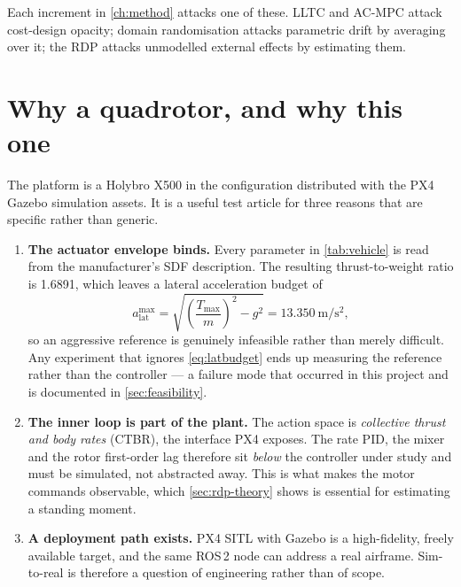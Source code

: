\documentclass[11pt,a4paper,twoside,openright]{report}
\newcommand{\vTW}{1.6891}                %
\DeclareRobustCommand{\ACMPC}{AC\nbd MPC}
\DeclareRobustCommand{\LLTC}{LLTC}
\DeclareRobustCommand{\RDP}{RDP}
\DeclareRobustCommand{\CTBR}{CTBR}
\theoremstyle{plain}
\theoremstyle{definition}
\theoremstyle{remark}
\DeclareRobustCommand{\nbd}{\mbox{-}}
\begin{document}
	Each increment in \cref{ch:method} attacks one of these. \LLTC{} and \ACMPC{}
	attack cost-design opacity; domain randomisation attacks parametric drift by
	averaging over it; the \RDP{} attacks unmodelled external effects by estimating
	them.

	\section{Why a quadrotor, and why this one}

	The platform is a Holybro X500 in the configuration distributed with the PX4
	Gazebo simulation assets. It is a useful test article for three reasons that are
	specific rather than generic.

	\begin{enumerate}[leftmargin=*]
		\item \textbf{The actuator envelope binds.} Every parameter in
		\cref{tab:vehicle} is read from the manufacturer's SDF description. The
		resulting thrust-to-weight ratio is \vTW, which leaves a lateral
		acceleration budget of
		\begin{equation}
			a_\mathrm{lat}^{\max}=\sqrt{\left(\frac{T_{\max}}{m}\right)^{\!2}-g^2}
			=\SI{13.350}{\metre\per\square\second},
			\label{eq:latbudget}
		\end{equation}
		so an aggressive reference is genuinely infeasible rather than merely
		difficult. Any experiment that ignores \cref{eq:latbudget} ends up measuring
		the reference rather than the controller --- a failure mode that occurred in
		this project and is documented in \cref{sec:feasibility}.
		\item \textbf{The inner loop is part of the plant.} The action space is
		\emph{collective thrust and body rates} (\CTBR), the interface PX4 exposes.
		The rate PID, the mixer and the rotor first-order lag therefore sit
		\emph{below} the controller under study and must be simulated, not abstracted
		away. This is what makes the motor commands observable, which
		\cref{sec:rdp-theory} shows is essential for estimating a standing moment.
		\item \textbf{A deployment path exists.} PX4 SITL with Gazebo is a
		high-fidelity, freely available target, and the same ROS\,2 node can address a
		real airframe. Sim-to-real is therefore a question of engineering rather than
		of scope.
	\end{enumerate}
\end{document}
